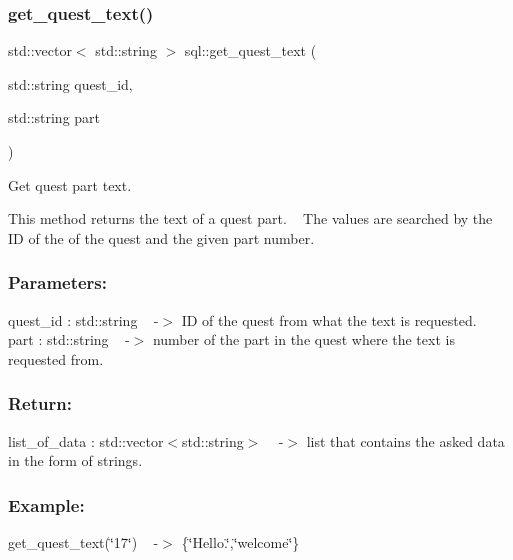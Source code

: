 \subsubsection{\texorpdfstring{get\+\_\+quest\+\_\+text()}{get\_quest\_text()}}
{\footnotesize\ttfamily std\+::vector$<$ std\+::string $>$ sql\+::get\+\_\+quest\+\_\+text (\begin{DoxyParamCaption}\item[{std\+::string}]{quest\+\_\+id,  }\item[{std\+::string}]{part }\end{DoxyParamCaption})}



Get quest part text. 

This method returns the text of a quest part. ~\newline
The values are searched by the ID of the of the quest and the given part number. ~\newline


\subsubsection*{Parameters\+: }

quest\+\_\+id \+: std\+::string ~\newline
-\/$>$ ID of the quest from what the text is requested.~\newline
 part \+: std\+::string ~\newline
-\/$>$ number of the part in the quest where the text is requested from. ~\newline


\subsubsection*{Return\+: }

list\+\_\+of\+\_\+data \+: std\+::vector$<$std\+::string$>$ ~\newline
-\/$>$ list that contains the asked data in the form of strings.~\newline


\subsubsection*{Example\+: }

get\+\_\+quest\+\_\+text(\char`\"{}17\char`\"{}) ~\newline
-\/$>$ \{\char`\"{}\+Hello.\char`\"{},\char`\"{}welcome\char`\"{}\} 


